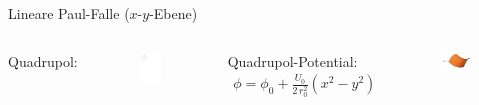 \documentclass[12pt,xcolor=dvipsnames]{beamer}
\begin{document}
\begin{frame}{Lineare Paul-Falle ($x$-$y$-Ebene)}
	\begin{columns}[t]
		Quadrupol:
		\begin{figure}[h]
			\centering
			\includegraphics[width=0.8\textwidth]{./figures/lineare_paulfalle_xy_statisch.pdf}
		\end{figure}
		
		Quadrupol-Potential:
		\begin{align}
		\phi = \phi_0 + \frac{U_0}{2 \, r_0^2} (x^2-y^2)
		\end{align}
		\begin{figure}[h]
			\centering
			\includegraphics[width=0.95\textwidth]{./figures/sattelpotential.pdf}
		\end{figure}
	\end{columns}
\end{frame}
\end{document}
